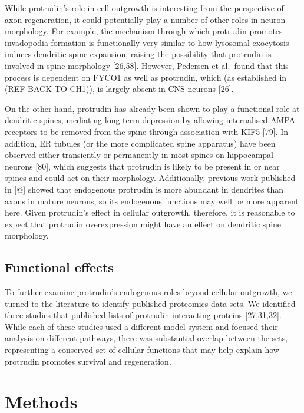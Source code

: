 \documentclass[
  12pt,
  a4paper,
]{book}
\begin{document}
While protrudin's role in cell outgrowth is interesting from the perspective of axon regeneration, it could potentially play a number of other roles in neuron morphology. For example, the mechanism through which protrudin promotes invadopodia formation is functionally very similar to how lysosomal exocytosis induces dendritic spine expansion, raising the possibility that protrudin is involved in spine morphology {[}26,58{]}. However, Pedersen et al.~found that this process is dependent on FYCO1 as well as protrudin, which (as established in (REF BACK TO CH1)), is largely absent in CNS neurons {[}26{]}.

On the other hand, protrudin has already been shown to play a functional role at dendritic spines, mediating long term depression by allowing internalised AMPA receptors to be removed from the spine through association with KIF5 {[}79{]}. In addition, ER tubules (or the more complicated spine apparatus) have been observed either transiently or permanently in most spines on hippocampal neurons {[}80{]}, which suggests that protrudin is likely to be present in or near spines and could act on their morphology. Additionally, previous work published in {[}@{]} showed that endogenous protrudin is more abundant in dendrites than axons in mature neurons, so its endogenous functions may well be more apparent here. Given protrudin's effect in cellular outgrowth, therefore, it is reasonable to expect that protrudin overexpression might have an effect on dendritic spine morphology.

\hypertarget{functional-effects}{%
\subsection{Functional effects}\label{functional-effects}}

To further examine protrudin's endogenous roles beyond cellular outgrowth, we turned to the literature to identify published proteomics data sets. We identified three studies that published lists of protrudin-interacting proteins {[}27,31,32{]}. While each of these studies used a different model system and focused their analysis on different pathways, there was substantial overlap between the sets, representing a conserved set of cellular functions that may help explain how protrudin promotes survival and regeneration.

\hypertarget{methods-1}{%
\section{Methods}\label{methods-1}}
\end{document}
